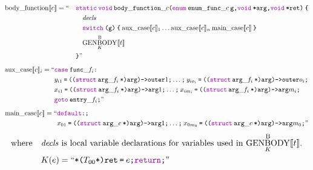 \documentclass[a4paper,fleqn]{article}
\newcommand{\BRA}[1]{\llbracket #1 \rrbracket}
\DeclareMathOperator{\genbody}{GENBODY}
\newcommand{\genbodyb}[2]{\genbody^\mathrm{B}_{#1}\BRA{#2}}
\newcommand{\bodyfunction}[1]{\mathrm{body\_function}\BRA{#1}}
\newcommand{\auxcase}[2]{\mathrm{aux\_case}\BRA{#1}_{#2}}
\newcommand{\maincase}[1]{\mathrm{main\_case}\BRA{#1}}
\newcommand{\ldq}{\text{``}}
\newcommand{\rdq}{\text{''}}
\newcommand{\dq}[1]{\text{``}#1\text{''}}
\newcommand{\ttparen}[1]{\texttt{(}#1\texttt{)}}
\newcommand{\ttlbrace}{\texttt{\char '173}}
\newcommand{\ttrbrace}{\texttt{\char '175}}
\newcommand{\ttbrace}[1]{\ttlbrace#1\ttrbrace}
\newcommand{\tteq}{\texttt{=}}
\newcommand{\ttsemi}{\texttt{;}}
\newcommand{\ttcomma}{\texttt{,}}
\newcommand{\ttcolon}{\texttt{:}}
\newcommand{\ttstar}{\texttt{*}}
\newcommand{\kwswitch}{\mbox{\color{myviolet}\ttfamily switch}}
\newcommand{\kwgoto}{\mbox{\color{myviolet}\ttfamily goto}}
\newcommand{\kwstruct}{\mbox{\color{myviolet}\ttfamily struct}}
\newcommand{\kwvoid}{\mbox{\color{myviolet}\ttfamily void}}
\newcommand{\kwCreturn}{\mbox{\color{myviolet}\ttfamily return}}
\newcommand{\kwcase}{\mbox{\color{myviolet}\ttfamily case}}
\newcommand{\kwdefault}{\mbox{\color{myviolet}\ttfamily default}}
\newcommand{\kwenum}{\mbox{\color{myviolet}\ttfamily enum}}
\newcommand{\kwstatic}{\mbox{\color{myviolet}\ttfamily static}}
\begin{document}
\begin{alignat*}{2}
  \bodyfunction{c} &= \ldq
    && \kwstatic\:\kwvoid\:\mathtt{body\_function\_}c\ttparen{\kwenum\:\mathtt{enum\_func\_}c\:\mathtt{g}\ttcomma \kwvoid\:\ttstar\mathtt{arg}\ttcomma \kwvoid\:\ttstar\mathtt{ret}}\:\ttlbrace \\
  & && \quad \mathit{decls} \\
  & && \quad \kwswitch\:\ttparen{\mathtt{g}}\:\ttbrace{\:\auxcase{c}{1} \ldots \auxcase{c}{n}\:\maincase{c}\:} \\
  & && \quad {\genbodyb{K}{t}} \\
  & && \ttrbrace \rdq
\end{alignat*}
\begin{align*}
  \auxcase{c}{i} = \ldq & \kwcase\:\mathtt{func\_}f_i\ttcolon \\
  & y_{i1}\:\tteq\:\ttparen{\ttparen{\kwstruct\:\mathtt{arg\_}f_i\:\ttstar}\mathtt{arg}}\texttt{->}\mathtt{outer}1\ttsemi \ldots\ttsemi\:y_{io_i}\:\tteq\:\ttparen{\ttparen{\kwstruct\:\mathtt{arg\_}f_i\:\ttstar}\mathtt{arg}}\texttt{->}\mathtt{outer}o_i\ttsemi \\
  & x_{i1}\:\tteq\:\ttparen{\ttparen{\kwstruct\:\mathtt{arg\_}f_i\:\ttstar}\mathtt{arg}}\texttt{->}\mathtt{arg}1\ttsemi \ldots\ttsemi\:x_{im_i}\:\tteq\:\ttparen{\ttparen{\kwstruct\:\mathtt{arg\_}f_i\:\ttstar}\mathtt{arg}}\texttt{->}\mathtt{arg}m_i\ttsemi \\
  & \kwgoto\:\mathtt{entry\_}f_i\ttsemi \rdq
\end{align*}
\begin{align*}
  \maincase{c} = \ldq & \kwdefault\ttcolon\ttsemi \\
  & x_{01}\:\tteq\:\ttparen{\ttparen{\kwstruct\:\mathtt{arg\_}c\:\ttstar}\mathtt{arg}}\texttt{->}\mathtt{arg}1\ttsemi \ldots\ttsemi\:x_{0m_0}\:\tteq\:\ttparen{\ttparen{\kwstruct\:\mathtt{arg\_}c\:\ttstar}\mathtt{arg}}\texttt{->}\mathtt{arg}m_0\ttsemi \rdq
\end{align*}
\[ \text{where} \quad
  \begin{aligned}[t]
    & \text{$\mathit{decls}$ is local variable declarations for variables used in $\genbodyb{K}{t}$.} \\
    & K(e) = \dq{\ttstar\ttparen{T_{00}\ttstar}\texttt{ret}\:\tteq\:e\ttsemi \kwCreturn\ttsemi}
  \end{aligned}
\]
\end{document}
